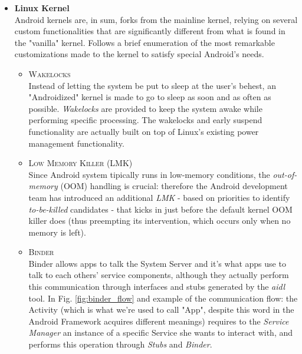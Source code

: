 \begin{itemize}
\item \textbf{Linux Kernel}\\
Android kernels are, in sum, forks from the mainline kernel, relying on several custom 	functionalities that are significantly different from what is found in the "vanilla" kernel. Follows a brief enumeration of the most remarkable customizations made to the kernel to satisfy special Android's needs.
	\begin{itemize}
	\item \textsc{Wakelocks}\\
	Instead of letting the system be put to sleep at the user's behest, an "Androidized"
kernel is made to go to sleep as soon and as often as possible. \textit{Wakelocks} are provided to keep the system awake while performing specific processing. The wakelocks and early suspend functionality are actually built on top of Linux's existing power management functionality.
	\item \textsc{Low Memory Killer (LMK)}\\
	Since Android system tipically runs in low-memory conditions, the \textit{out-of-memory} (OOM) handling is crucial: therefore the Android development team has introduced an additional \textit{LMK} - based on priorities to identify \textit{to-be-killed} candidates - that kicks in just before the default kernel OOM killer does (thus preempting its intervention, which occurs only when no memory is left).
	\item \textsc{Binder}\\
	Binder allows apps to talk the System Server and it's what apps use to talk to each others' service components, although they actually perform this communication through  interfaces and stubs generated by the \textit{aidl} tool. In Fig. \ref{fig:binder_flow} and example of the communication flow: the Activity (which is what we're used to call "App", despite this word in the Android Framework acquires different meanings) requires to the \textit{Service Manager} an instance of a specific Service she wants to interact with, and performs this operation through \textit{Stubs} and \textit{Binder}.
		\begin{figure}[!htb]
			\centering

\end{figure}
\end{itemize}
\end{itemize}

